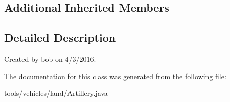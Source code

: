 \subsection*{Additional Inherited Members}


\subsection{Detailed Description}
Created by bob on 4/3/2016. 

The documentation for this class was generated from the following file\+:\begin{DoxyCompactItemize}
\item 
tools/vehicles/land/Artillery.\+java\end{DoxyCompactItemize}
